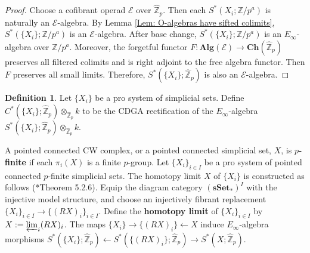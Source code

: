 \documentclass[11pt]{amsart}
\theoremstyle{definition}
\newtheorem{definition}[theorem]{Definition}
\numberwithin{equation}{section}
\numberwithin{equation}{section}
\newcommand\ZZ{\mathbb{Z}}
\begin{document}
\begin{proof}
Choose a cofibrant operad $\mathcal{E}$ over $\widehat{\ZZ}_p$. Then each $S^*(X_i;\ZZ/p^a)$ is naturally an $\mathcal{E}$-algebra. By Lemma \ref{Lem: O-algebras have sifted colimits}, $S^*(\{X_i\};\ZZ/p^a)$ is an $\mathcal{E}$-algebra. After base change, $S^*(\{X_i\};\ZZ/p^a)$ is an $E_{\infty}$-algebra over $\ZZ/p^a$. Moreover, the forgetful functor $F:\mathbf{Alg}(\mathcal{E})\rightarrow \mathbf{Ch}(\widehat{\ZZ}_p)$ preserves all filtered colimits and is right adjoint to the free algebra functor. Then $F$ preserves all small limits. Therefore, $S^*(\{X_i\};\widehat{\ZZ}_p)$ is also an $\mathcal{E}$-algebra.
\end{proof}

\begin{definition}
Let $\{X_i\}$ be a pro system of simplicial sets. Define $C^*(\{X_i\};\widehat{\ZZ}_p)\otimes_{\widehat{\ZZ}_p} k$ to be the CDGA rectification of the $E_{\infty}$-algebra $S^*(\{X_i\};\widehat{\ZZ}_p)\otimes_{\widehat{\ZZ}_p} k$.
\end{definition}

A pointed connected CW complex, or a pointed connected simplicial set, $X$, is \textbf{$p$-finite} if each $\pi_i(X)$ is a finite $p$-group. Let $\{X_i\}_{i\in I}$ be a pro system of pointed connected $p$-finite simplicial sets. The homotopy limit $X$ of $\{X_i\}$ is constructed as follows (\cite{Riehl-homotopy-categories}*{Theorem 5.2.6}). Equip the diagram category $(\mathbf{sSet}_*)^{I}$ with the injective model structure, and choose an injectively fibrant replacement $\{X_i\}_{i\in I}\rightarrow \{(RX)_i\}_{i\in I}$. Define the \textbf{homotopy limit} of $\{X_i\}_{i\in I}$ by $X:=\varprojlim_i (RX)_i$. 
The maps $\{X_i\}\rightarrow \{(RX)_i\}\leftarrow X$ induce $E_{\infty}$-algebra morphisms $S^*(\{X_i\};\widehat{\ZZ}_p)\leftarrow S^*(\{(RX)_i\};\widehat{\ZZ}_p)\rightarrow S^*(X;\widehat{\ZZ}_p)$.
\end{document}
